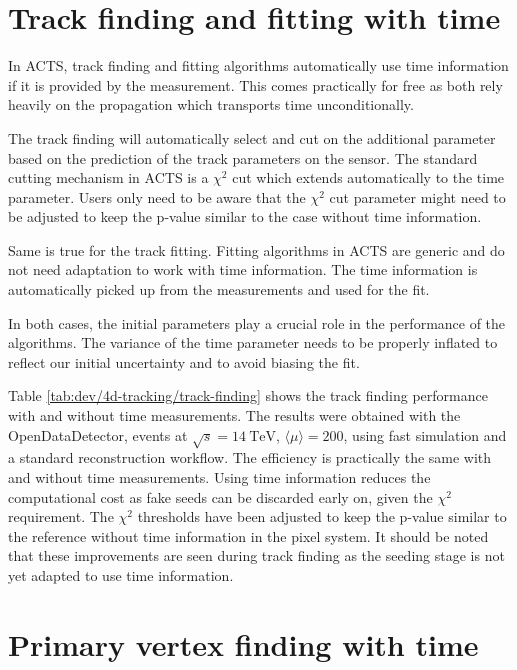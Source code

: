 \section{Track finding and fitting with time}

In ACTS, track finding and fitting algorithms automatically use time information if it is provided by the measurement. This comes practically for free as both rely heavily on the propagation which transports time unconditionally.

The track finding will automatically select and cut on the additional parameter based on the prediction of the track parameters on the sensor. The standard cutting mechanism in ACTS is a $\chi^2$ cut which extends automatically to the time parameter. Users only need to be aware that the $\chi^2$ cut parameter might need to be adjusted to keep the p-value similar to the case without time information.

Same is true for the track fitting. Fitting algorithms in ACTS are generic and do not need adaptation to work with time information. The time information is automatically picked up from the measurements and used for the fit.

In both cases, the initial parameters play a crucial role in the performance of the algorithms. The variance of the time parameter needs to be properly inflated to reflect our initial uncertainty and to avoid biasing the fit.



Table \ref{tab:dev/4d-tracking/track-finding} shows the track finding performance with and without time measurements. The results were obtained with the OpenDataDetector, \ttbar events at $\sqrt{s} = 14 \ \text{TeV}$, $\langle \mu \rangle = 200$, using fast simulation and a standard reconstruction workflow. The efficiency is practically the same with and without time measurements. Using time information reduces the computational cost as fake seeds can be discarded early on, given the $\chi^2$ requirement. The $\chi^2$ thresholds have been adjusted to keep the p-value similar to the reference without time information in the pixel system. It should be noted that these improvements are seen during track finding as the seeding stage is not yet adapted to use time information.

\section{Primary vertex finding with time}

